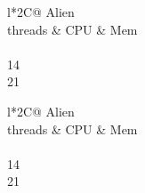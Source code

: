 \begin{table}\sffamily
\begin{tabular}{l*2{C}@{}}
\toprule
Alien\\threads & CPU & Mem\\
\\
14\\
21\\

\bottomrule 
\end{tabular}
\caption{8 OSD, 4 Reactors, 4k Random read: OSD utilisation}
\end{table}

\begin{table}\sffamily
\begin{tabular}{l*2{C}@{}}
\toprule
Alien\\threads & CPU & Mem\\
\\
14\\
21\\

\bottomrule 
\end{tabular}
\caption{8 OSD, 4 Reactors, 4k Random read: FIO utilisation}
\end{table}

